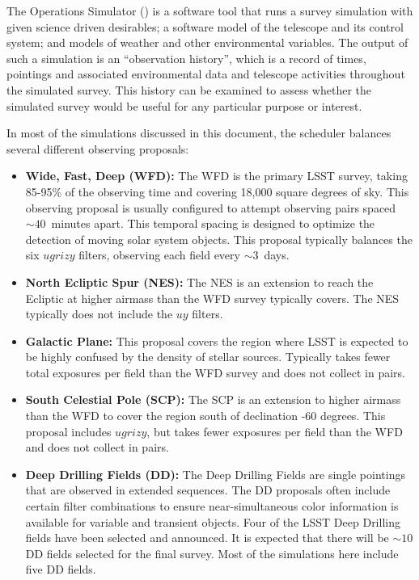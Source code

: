 The Operations Simulator (\OpSim) is a software tool that runs a survey simulation with given science driven desirables;
a software model of the telescope and its control system; and models of weather and other environmental variables. The
output of such a simulation is an “observation history”, which is a record of times, pointings and associated environmental  data  and  telescope  activities  throughout  the  simulated  survey.  This history can be examined to assess
whether the simulated survey would be useful for any particular purpose or interest.

In most of the simulations discussed in this document, the \OpSim scheduler balances several different observing proposals:
\begin{itemize}
\item {\bf Wide, Fast, Deep (WFD):} The WFD is the primary LSST survey, taking 85-95\% of the observing time and covering 18,000 square degrees of sky. This observing proposal is usually configured to attempt observing pairs spaced $\sim40$\ minutes apart.  This temporal spacing is designed to optimize the detection of moving solar system objects. This proposal typically balances the six $ugrizy$ filters, observing each field every $\sim3$\ days.
\item {\bf North Ecliptic Spur (NES):} The NES is an extension to reach the Ecliptic at higher airmass than the WFD survey typically covers.  The NES typically does not include the $uy$ filters.
\item {\bf Galactic Plane:} This proposal covers the region where LSST is expected to be highly confused by the density of stellar sources.  Typically takes fewer total exposures per field than the WFD survey and does not collect in pairs.
\item {\bf South Celestial Pole (SCP):} The SCP is an extension to higher airmass than the WFD to cover the region south of declination -60 degrees.  This proposal includes $ugrizy$, but takes fewer exposures per field than the WFD and does not collect in pairs.
\item {\bf Deep Drilling Fields (DD):} The Deep Drilling Fields are single pointings that are observed in extended sequences. The DD proposals often include certain filter combinations to ensure near-simultaneous color information is available for variable and transient objects. Four of the LSST Deep Drilling fields have been selected and announced. It is expected that there will be $\sim10$ DD fields selected for the final survey. Most of the simulations here include five DD fields.
\end{itemize}


